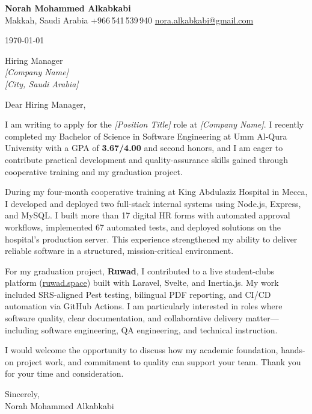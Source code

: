 \documentclass[11pt,a4paper]{article}
\begin{document}
\textbf{Norah Mohammed Alkabkabi}\\
Makkah, Saudi Arabia \textbar{} +966\,541\,539\,940 \textbar{}
\href{mailto:nora.alkabkabi@gmail.com}{nora.alkabkabi@gmail.com}

\vspace{12pt}
\today

\vspace{12pt}
Hiring Manager\\
\textit{[Company Name]}\\
\textit{[City, Saudi Arabia]}

Dear Hiring Manager,

I am writing to apply for the \textit{[Position Title]} role at \textit{[Company Name]}. I recently completed my Bachelor of Science in Software Engineering at Umm Al-Qura University with a GPA of \textbf{3.67/4.00} and second honors, and I am eager to contribute practical development and quality-assurance skills gained through cooperative training and my graduation project.

During my four-month cooperative training at King Abdulaziz Hospital in Mecca, I developed and deployed two full-stack internal systems using Node.js, Express, and MySQL. I built more than 17 digital HR forms with automated approval workflows, implemented 67 automated tests, and deployed solutions on the hospital's production server. This experience strengthened my ability to deliver reliable software in a structured, mission-critical environment.

For my graduation project, \textbf{Ruwad}, I contributed to a live student-clubs platform (\href{https://ruwad.space}{ruwad.space}) built with Laravel, Svelte, and Inertia.js. My work included SRS-aligned Pest testing, bilingual PDF reporting, and CI/CD automation via GitHub Actions. I am particularly interested in roles where software quality, clear documentation, and collaborative delivery matter---including software engineering, QA engineering, and technical instruction.

I would welcome the opportunity to discuss how my academic foundation, hands-on project work, and commitment to quality can support your team. Thank you for your time and consideration.

Sincerely,\\[18pt]
Norah Mohammed Alkabkabi
\end{document}
